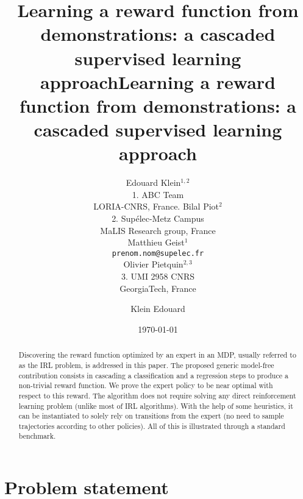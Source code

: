 \documentclass[11pt]{article}
\title{Learning a reward function from demonstrations: a cascaded supervised
learning approach}
\author{Edouard Klein$^{1,2}$\\
1. ABC Team\\
LORIA-CNRS, France.
\And Bilal Piot$^{2}$\\
2. Supélec-Metz Campus\\
MaLIS Research group, France\\
\And Matthieu Geist$^1$\\
\texttt{prenom.nom@supelec.fr}\\
\And Olivier Pietquin$^{2,3}$\\
3. UMI 2958 CNRS\\
GeorgiaTech, France
}
\title{Learning a reward function from demonstrations: a cascaded supervised learning approach}
\author{Klein Edouard}
\date{\today}
\newcommand{\0}{\mathbf{0}}
\newcommand{\1}{\mathbf{1}}
\begin{document}
\maketitle



\begin{abstract}
Discovering the reward function optimized by an expert in an MDP, usually referred to as the IRL problem, is addressed in this paper. The proposed generic model-free contribution consists in cascading a classification and a regression steps to produce a non-trivial reward function. We prove the expert policy to be near optimal with respect to this reward. The algorithm does not require solving any direct reinforcement learning problem (unlike most of IRL algorithms). With the help of some heuristics, it can be instantiated to solely rely on transitions from the expert (no need to sample trajectories according to other policies). All of this is illustrated through a standard benchmark.
\end{abstract}
\section{Problem statement}
\label{sec-1}
\end{document}
